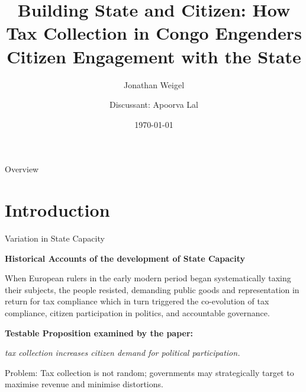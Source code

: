 \documentclass[12pt, aspectratio=169]{beamer}
\begin{document}



\title{Building State and Citizen:
How Tax Collection in Congo Engenders
Citizen Engagement with the State}
\subtitle{Jonathan Weigel}

\author{Discussant: Apoorva Lal}

\date{\today}

\frame{\titlepage}


\begin{frame}{Overview}
\tableofcontents
\end{frame}



\section{Introduction}
\begin{frame}{Variation in State Capacity}


\textbf{Historical Accounts of the development of State Capacity}

When European rulers in the early modern period began systematically
taxing their subjects, the people resisted, demanding public goods and
representation in return for tax compliance which in turn triggered
the co-evolution of tax compliance, citizen participation in politics,
and accountable governance.
\parencite{tillyCoercionCapitalEuropean1990,northConstitutionsCommitmentEvolution1989}

\vspace{5mm}

\textbf{Testable Proposition examined by the paper:}

\emph{tax collection increases citizen demand for political participation.}

Problem: Tax collection is not random; governments may strategically
target to maximise revenue and minimise distortions.

\end{frame}
\end{document}
